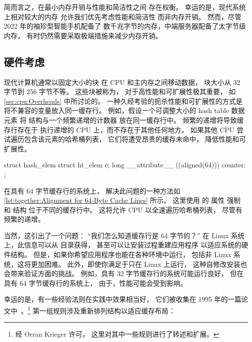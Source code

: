 简而言之，在最小内存开销与性能和简洁性之间
存在权衡。
幸运的是，现代系统上相对较大的内存
允许我们优先考虑性能和简洁性
而非内存开销。
然而，尽管 2022 年的袖珍型智能手机配备了
数千兆字节的内存，中端服务器配备了太字节级内存，
有时仍然需要采取极端措施来减少内存开销。

\subsection{硬件考虑}
\label{sec:together:Hardware Considerations}

现代计算机通常以固定大小的块
在 CPU 和主内存之间移动数据，
块大小从 32 字节到 256 字节不等。
这些块被称为\emph{}，
对于高性能和可扩展性极其重要，
如 \cref{sec:cpu:Overheads} 中所讨论的。
一种久经考验的扼杀性能和可扩展性的方式是
将不兼容的变量放入同一缓存行。
例如，假设一个可调整大小的 hash table 数据元素
将  结构与一个频繁递增的计数器
放在同一缓存行中。
频繁的递增将导致缓存行存在于
执行递增的 CPU 上，而不存在于其他任何地方。
如果其他 CPU 尝试遍历包含该元素的哈希桶列表，
它们将遭受昂贵的缓存未命中，
降低性能和可扩展性。

\begin{listing}
\begin{VerbatimL}
struct hash_elem {
	struct ht_elem e;
	long __attribute__ ((aligned(64))) counter;
};
\end{VerbatimL}
\caption{64 字节缓存行的对齐}
\label{lst:together:Alignment for 64-Byte Cache Lines}
\end{listing}

在具有 64 字节缓存行的系统上，
解决此问题的一种方法如
\cref{lst:together:Alignment for 64-Byte Cache Lines} 所示。
这里使用 \GCC 的  属性
强制  和  结构
位于不同的缓存行中。
这将允许 CPU 以全速遍历哈希桶列表，
尽管有频繁的递增。

当然，这引出了一个问题：
``我们怎么知道缓存行是 64 字节的？''
在 Linux 系统上，此信息可以从
 目录获得，
甚至可以让安装过程重建应用程序
以适应系统的硬件结构。
但是，如果你希望应用程序也能在各种环境中运行，
包括非 Linux 系统，这将更加困难。
此外，即使你满足于只在 Linux 上运行，
这种自修改安装也会带来验证方面的挑战。
例如，具有 32 字节缓存行的系统可能运行良好，
但在具有 64 字节缓存行的系统上，
由于，性能可能会受到影响。

幸运的是，有一些经验法则在实践中效果相当好，
它们被收集在 1995 年的一篇论文中~\cite{BenjaminGamsa95a}。\footnote{
	经 Orran Krieger 许可，
	这里对其中一些规则进行了转述和扩展。}
第一组规则涉及重新排列结构以适应缓存布局：

